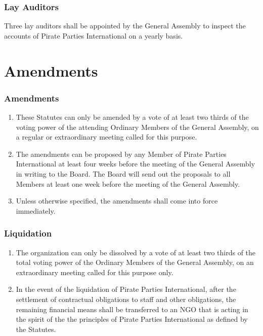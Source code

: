 \begin{frame}

\frametitle{Lay Auditors}
\label{layauditors}

Three lay auditors shall be appointed by the General Assembly to inspect the accounts of Pirate Parties International on a yearly basis.

\end{frame}

\section{Amendments}
\label{amendments}

\begin{frame}

\frametitle{Amendments}
\label{amendments}

\begin{enumerate}
\item These Statutes can only be amended by a vote of at least two thirds of the voting power of the attending Ordinary Members of the General Assembly, on a regular or extraordinary meeting called for this purpose.

\item The amendments can be proposed by any Member of Pirate Parties International at least four weeks before the meeting of the General Assembly in writing to the Board. The Board will send out the proposals to all Members at least one week before the meeting of the General Assembly.

\item Unless otherwise specified, the amendments shall come into force immediately.

\end{enumerate}

\end{frame}

\begin{frame}

\frametitle{Liquidation}
\label{liquidation}

\begin{enumerate}
\item The organization can only be dissolved by a vote of at least two thirds of the total voting power of the Ordinary Members of the General Assembly, on an extraordinary meeting called for this purpose only.

\item In the event of the liquidation of Pirate Parties International, after the settlement of contractual obligations to staff and other obligations, the remaining financial means shall be transferred to an NGO that is acting in the spirit of the the principles of Pirate Parties International as defined by the Statutes.

\end{enumerate}

\end{frame}


